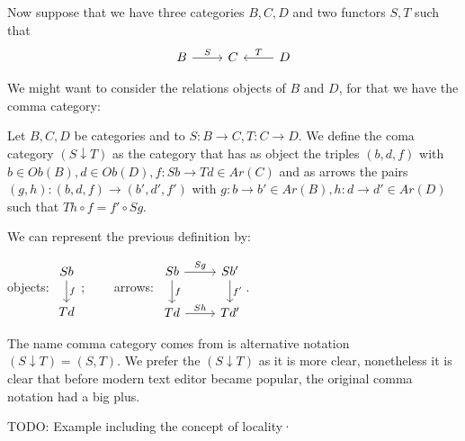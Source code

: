 Now suppose that we have three categories $B,C,D$ and two functors $S,T$ such that
\[
  \begin{tikzcd}
    B \ar[r, "S"] & C & D\ar[l, "T", swap]
  \end{tikzcd}
\]

We might want to consider the relations objects of $B$ and $D$, for that we have the comma category:


\begin{definition}
  Let $B,C,D$ be categories and to $S:B\to C,T: C\to D$. We define the coma category $(S\downarrow T)$ as the category that has as object the triples $(b,d,f)$ with $b\in Ob(B), d\in Ob(D), f:Sb\to Td\in Ar(C)$ and as arrows the pairs $(g,h):(b,d,f)\to (b',d',f')$ with $g:b\to b'\in Ar(B), h:d\to d'\in Ar(D)$ such that $Th \circ f = f' \circ Sg$. 
\end{definition}

We can represent the previous definition by:
\begin{center}
  objects: $
  \begin{tikzcd}
    Sb\ar[d,"f"]
    \\
    Td
  \end{tikzcd}
  $;$\qquad$ arrows: $\begin{tikzcd}
    Sb\ar[d,"f"]\ar[r,"Sg"] & Sb' \ar[d,"f'"]
    \\
    Td\ar[r,"Sh"] & Td'
  \end{tikzcd}$.
\end{center}


The name comma category comes from is alternative notation $(S\downarrow T) = (S,T)$. We prefer the $(S\downarrow T)$ as it is more clear, nonetheless it is clear that before modern text editor became popular, the original comma notation had a big plus.

\begin{example}
  TODO: Example including the concept of locality·
\end{example}